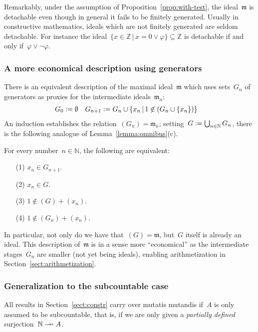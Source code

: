 \documentclass[envcountsect,envcountsame,runningheads]{llncs}
\newcommand{\mmm}{\mathfrak{m}}
\newcommand{\NN}{\mathbb{N}}
\newcommand{\ZZ}{\mathbb{Z}}
\newcommand{\defeq}{\vcentcolon=}
\renewcommand{\_}{\mathpunct{.}\,}
\begin{document}
Remarkably, under the assumption of Proposition~\ref{prop:with-test}, the ideal~$\mmm$ is detachable even though in
general it fails to be finitely generated. Usually in constructive mathematics, ideals which are not
finitely generated are seldom detachable. For instance the ideal~$\{ x \in
\ZZ \,|\, x = 0 \vee \varphi \} \subseteq \ZZ$ is detachable if and only
if~$\varphi \vee \neg\varphi$.


\subsubsection{A more economical description using generators}

There is an equivalent description of the
maximal ideal~$\mmm$ which uses sets~$G_n$ of generators as proxies for the
intermediate ideals~$\mmm_n$:
\begin{align*}
  G_0 &\defeq \emptyset &
  G_{n+1} &\defeq G_n \cup \{ x_n \,|\, 1 \not\in (G_n \cup \{ x_n \}) \}
\end{align*}
An induction establishes the relation~$(G_n) = \mmm_n$; setting~$G \defeq
\bigcup_{n\in\NN} G_n$, there is the following analogue of
Lemma~\ref{lemma:omnibus}(c).

\begin{lemma}\label{lemma:via-generators}For every number~$n \in \NN$, the following are equivalent:
\begin{enumerate}
\item[(1)] $x_n \in G_{n+1}$.
\item[(2)] $x_n \in G$.
\item[(3)] $1 \not\in (G) + (x_n)$.
\item[(4)] $1 \not\in (G_n) + (x_n)$.
\end{enumerate}
\end{lemma}

In particular, not only do we have that~$(G) = \mmm$, but~$G$ itself is already
an ideal. This description of~$\mmm$ is in a sense more ``economical'' as the
intermediate stages~$G_n$ are smaller (not yet being ideals), enabling
arithmetization in Section~\ref{sect:arithmetization}.


\subsubsection{Generalization to the subcountable case}

\newcommand{\rightrightharpoonup}{\mathrel{\mathrlap{\rightharpoonup}\mkern1mu\rightharpoonup}}
All results in Section~\ref{sect:constr} carry over mutatis mutandis if~$A$ is
only assumed to be subcountable, that is, if we are only
given a \emph{partially defined} surjection~$\NN \rightrightharpoonup A$.
\end{document}
